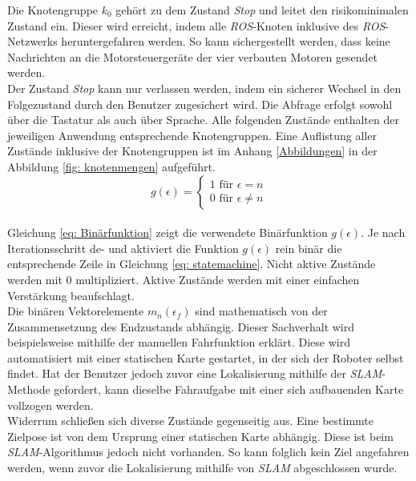 		Die Knotengruppe $k_0$ gehört zu dem Zustand \textit{Stop} und leitet den risikominimalen Zustand ein. Dieser wird erreicht, indem alle \textit{ROS}-Knoten inklusive des \textit{ROS}-Netzwerks heruntergefahren werden. So kann sichergestellt werden, dass keine Nachrichten an die Motorsteuergeräte der vier verbauten Motoren gesendet werden.\\
		
		Der Zustand \textit{Stop} kann nur verlassen werden, indem ein sicherer Wechsel in den Folgezustand durch den Benutzer zugesichert wird. Die Abfrage erfolgt sowohl über die Tastatur als auch über Sprache. Alle folgenden Zustände enthalten der jeweiligen Anwendung entsprechende Knotengruppen. Eine Auflistung aller Zustände inklusive der Knotengruppen ist im Anhang \ref{Abbildungen} in der Abbildung \ref{fig: knotenmengen} aufgeführt.\\ 
	
	\begin{equation}
	g(\epsilon)=\left\{\begin{array}{ll} 1 \text{ für } \epsilon=n \\
	0 \text{ für }\epsilon\neq n\end{array}\right. 
	\label{eq: Binärfunktion}
	\end{equation}\\
		
		Gleichung \ref{eq: Binärfunktion} zeigt die verwendete Binärfunktion $g(\epsilon)$. Je nach Iterationsschritt de- und aktiviert die Funktion $g(\epsilon)$ rein binär die entsprechende Zeile in Gleichung \ref{eq: statemachine}. Nicht aktive Zustände werden mit 0 multipliziert. Aktive Zustände werden mit einer einfachen Verstärkung beaufschlagt. \\
		
		Die binären Vektorelemente $m_n(\epsilon_f)$ sind mathematisch von der Zusammensetzung des Endzustands abhängig. Dieser Sachverhalt wird beispielsweise mithilfe der manuellen Fahrfunktion erklärt. Diese wird automatisiert mit einer statischen Karte gestartet, in der sich der Roboter selbst findet. Hat der Benutzer jedoch zuvor eine Lokalisierung mithilfe der \textit{SLAM}-Methode gefordert, kann dieselbe Fahraufgabe mit einer sich aufbauenden Karte vollzogen werden.\\
		
		Widerrum schließen sich diverse Zustände gegenseitig aus. Eine bestimmte Zielpose ist von dem Ursprung einer statischen Karte abhängig. Diese ist beim \textit{SLAM}-Algorithmus jedoch nicht vorhanden. So kann folglich kein Ziel angefahren werden, wenn zuvor die Lokalisierung mithilfe von \textit{SLAM} abgeschlossen wurde.\\
		
